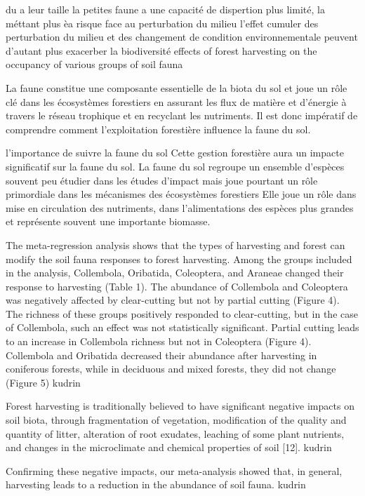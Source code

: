 du a leur taille la petites faune a une capacité de dispertion plus limité, la méttant plus èa risque face au perturbation du milieu
l'effet cumuler des perturbation du milieu et des changement de condition environnementale peuvent d'autant plus exacerber la biodiversité
 effects of forest harvesting on the occupancy of various groups of soil fauna

La faune constitue une composante essentielle de la biota du sol et joue un rôle clé dans les écosystèmes forestiers en assurant les flux de matière et d'énergie à travers le réseau trophique et en recyclant les nutriments. 
Il est donc impératif de comprendre comment l'exploitation forestière influence la faune du sol.

l'importance de suivre la faune du sol 
    Cette gestion forestière aura un impacte significatif sur la faune du sol.
    La faune du sol regroupe un ensemble d'espèces souvent peu étudier dans les études d'impact mais joue pourtant un rôle primordiale dans les mécanismes des écosystèmes forestiers
    Elle joue un rôle dans mise en circulation des nutriments, dans l'alimentations des espèces plus grandes et représente souvent une importante biomasse.

The meta-regression analysis shows that the types of harvesting and forest can modify the soil fauna responses to forest harvesting. Among the groups included in the analysis, Collembola, Oribatida, Coleoptera, and Araneae changed their response to harvesting (Table 1). The abundance of Collembola and Coleoptera was negatively affected by clear-cutting but not by partial cutting (Figure 4). The richness of these groups positively responded to clear-cutting, but in the case of Collembola, such an effect was not statistically significant. Partial cutting leads to an increase in Collembola richness but not in Coleoptera (Figure 4). Collembola and Oribatida decreased their abundance after harvesting in coniferous forests, while in deciduous and mixed forests, they did not change (Figure 5) kudrin

Forest harvesting is traditionally believed to have significant negative impacts on soil biota, through fragmentation of vegetation, modification of the quality and quantity of litter, alteration of root exudates, leaching of some plant nutrients, and changes in the microclimate and chemical properties of soil [12]. kudrin

Confirming these negative impacts, our meta-analysis showed that, in general, harvesting leads to a reduction in the abundance of soil fauna. kudrin

